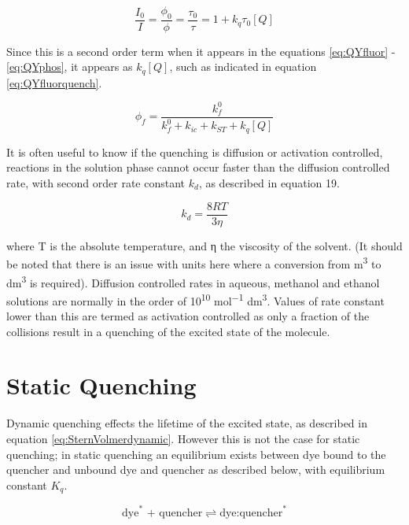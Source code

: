 \documentclass[
]{book}
\begin{document}
\begin{equation}
\frac{I_0}{I}=\frac{\phi_0}{\phi}=\frac{\tau_0}{\tau}=1 + k_q \tau _0 [Q]
\label{eq:SternVolmerdynamic}
\end{equation}

Since this is a second order term when it appears in the equations \eqref{eq:QYfluor} - \eqref{eq:QYphos}, it appears as \(k_q[Q]\), such as indicated in equation \eqref{eq:QYfluorquench}.

\begin{equation}
\phi_f = \frac{k_f^0}{k_f^0+k_{ic}+ k_{ST}+k_q[Q]}
\label{eq:QYfluorquench}
\end{equation}

It is often useful to know if the quenching is diffusion or activation controlled, reactions in the solution phase cannot occur faster than the diffusion controlled rate, with second order rate constant \(k_d\), as described in equation 19.

\begin{equation}
k_d = \frac{8RT}{3 \eta}
\label{eq:diffcontrol}
\end{equation}

where T is the absolute temperature, and η the viscosity of the solvent. (It should be noted that there is an issue with units here where a conversion from m\textsuperscript{3} to dm\textsuperscript{3} is required). Diffusion controlled rates in aqueous, methanol and ethanol solutions are normally in the order of 10\textsuperscript{10} mol\textsuperscript{−1} dm\textsuperscript{3}. Values of rate constant lower than this are termed as activation controlled as only a fraction of the collisions result in a quenching of the excited state of the molecule.

\hypertarget{sec:static}{%
\section{Static Quenching}\label{sec:static}}

Dynamic quenching effects the lifetime of the excited state, as described in equation \eqref{eq:SternVolmerdynamic}. However this is not the case for static quenching; in static quenching an equilibrium exists between dye bound to the quencher and unbound dye and quencher as described below, with equilibrium constant \(K_q\).

\begin{equation*}
\textrm{dye}^\ast \textrm{ + quencher} \rightleftharpoons \textrm{dye:quencher}^\ast
\end{equation*}
\end{document}
